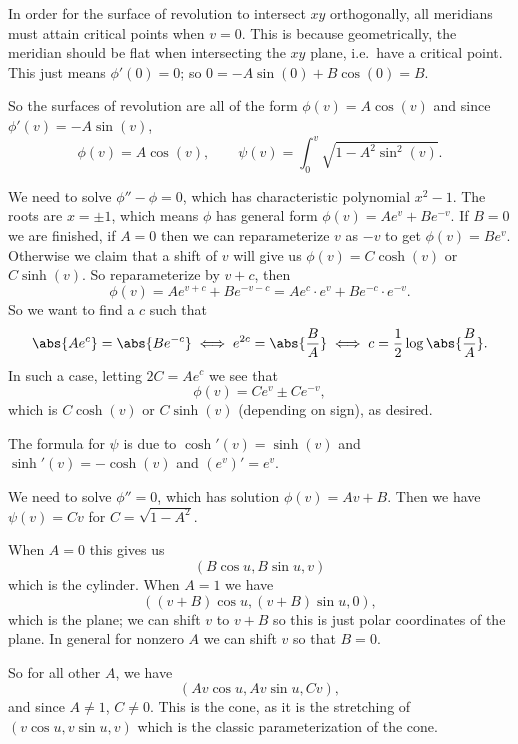     In order for the surface of revolution to intersect $xy$ orthogonally, all meridians must attain critical points when $v=0$.
    This is because geometrically, the meridian should be flat when intersecting the $xy$ plane, i.e.\ have a critical point.
    This just means $\phi'(0)=0$; so $0=-A\sin(0)+B\cos(0)=B$.

    So the surfaces of revolution are all of the form $\phi(v)=A\cos(v)$ and since $\phi'(v)=-A\sin(v)$,
    $$ \phi(v) = A\cos(v),\qquad \psi(v) = \int_0^v\sqrt{1-A^2\sin^2(v)} . $$

    \item We need to solve $\phi''-\phi=0$, which has characteristic polynomial $x^2-1$.
    The roots are $x=\pm1$, which means $\phi$ has general form $\phi(v)=Ae^v+Be^{-v}$.
    If $B=0$ we are finished, if $A=0$ then we can reparameterize $v$ as $-v$ to get $\phi(v)=Be^v$.
    Otherwise we claim that a shift of $v$ will give us $\phi(v)=C\cosh(v)$ or $C\sinh(v)$.
    So reparameterize by $v+c$, then
    $$ \phi(v)=Ae^{v+c}+Be^{-v-c} = Ae^c\cdot e^v + Be^{-c}\cdot e^{-v} . $$
    So we want to find a $c$ such that
    $$ \abs{Ae^c} = \abs{Be^{-c}} \iff e^{2c} = \abs{\frac BA} \iff c = \frac12\log\abs{\frac BA} . $$
    In such a case, letting $2C=Ae^c$ we see that
    $$ \phi(v) = Ce^v \pm Ce^{-v} , $$
    which is $C\cosh(v)$ or $C\sinh(v)$ (depending on sign), as desired.

    The formula for $\psi$ is due to $\cosh'(v)=\sinh(v)$ and $\sinh'(v)=-\cosh(v)$ and $(e^v)'=e^v$.

    \item We need to solve $\phi''=0$, which has solution $\phi(v)=Av+B$.
    Then we have $\psi(v)=Cv$ for $C=\sqrt{1-A^2}$.

    When $A=0$ this gives us
    $$ (B\cos u,B\sin u,v) $$
    which is the cylinder.
    When $A=1$ we have
    $$ ((v+B)\cos u,(v+B)\sin u,0) , $$
    which is the plane; we can shift $v$ to $v+B$ so this is just polar coordinates of the plane.
    In general for nonzero $A$ we can shift $v$ so that $B=0$.

    So for all other $A$, we have
    $$ (Av\cos u,Av\sin u,Cv) , $$
    and since $A\neq1$, $C\neq0$.
    This is the cone, as it is the stretching of $(v\cos u,v\sin u,v)$ which is the classic parameterization of the cone.
\eenum

\bprob

